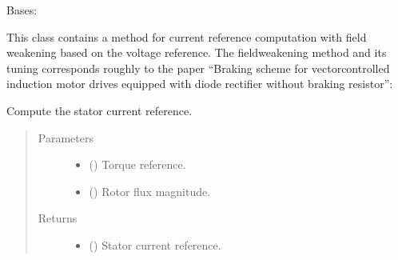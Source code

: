 \documentclass[letterpaper,10pt,english]{sphinxmanual}
\begin{document}

\begin{fulllineitems}
\label{\detokenize{control.im:control.im.vector.CurrentRef}}
\pysigstartsignatures
{}
\pysigstopsignatures
\sphinxAtStartPar
Bases: 

\sphinxAtStartPar
This class contains a method for current reference computation with
field weakening based on the voltage reference. The field\sphinxhyphen{}weakening method
and its tuning corresponds roughly to the paper “Braking scheme for
vector\sphinxhyphen{}controlled induction motor drives equipped with diode rectifier
without braking resistor”:
\begin{quote}

\sphinxAtStartPar
{}
\end{quote}

\begin{fulllineitems}
\label{\detokenize{control.im:control.im.vector.CurrentRef.output}}
\pysigstartsignatures
{}
\pysigstopsignatures
\sphinxAtStartPar
Compute the stator current reference.
\begin{quote}\begin{description}
\item[{Parameters}] \leavevmode\begin{itemize}
\item {} 
\sphinxAtStartPar
{} () \textendash{} Torque reference.

\item {} 
\sphinxAtStartPar
{} () \textendash{} Rotor flux magnitude.

\end{itemize}

\item[{Returns}] \leavevmode
\sphinxAtStartPar
\begin{itemize}
\item {} 
\sphinxAtStartPar
{} () \textendash{} Stator current reference.


\end{itemize}
\end{description}
\end{quote}
\end{fulllineitems}
\end{fulllineitems}
\end{document}
